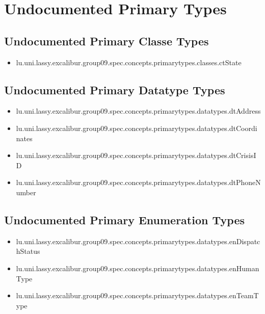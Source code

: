 \section[Undocumented Primary Types]{Undocumented Primary Types}

\subsection[Undocumented Primary Classe Types]{Undocumented Primary Classe Types}
\begin{itemize}
\item lu.uni.lassy.excalibur.group09.spec.concepts.primarytypes.classes.ctState 
\end{itemize}

\subsection[Undocumented Primary Datatype Types]{Undocumented Primary Datatype Types}
\begin{itemize}
\item lu.uni.lassy.excalibur.group09.spec.concepts.primarytypes.datatypes.dtAddress 
\item lu.uni.lassy.excalibur.group09.spec.concepts.primarytypes.datatypes.dtCoordinates 
\item lu.uni.lassy.excalibur.group09.spec.concepts.primarytypes.datatypes.dtCrisisID 
\item lu.uni.lassy.excalibur.group09.spec.concepts.primarytypes.datatypes.dtPhoneNumber 
\end{itemize}

\subsection[Undocumented Primary Enumeration Types]{Undocumented Primary Enumeration Types}
\begin{itemize}
\item lu.uni.lassy.excalibur.group09.spec.concepts.primarytypes.datatypes.enDispatchStatus 
\item lu.uni.lassy.excalibur.group09.spec.concepts.primarytypes.datatypes.enHumanType 
\item lu.uni.lassy.excalibur.group09.spec.concepts.primarytypes.datatypes.enTeamType 
\end{itemize}















